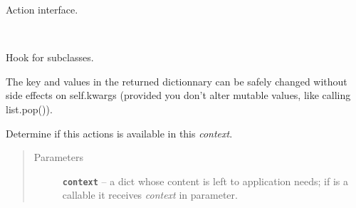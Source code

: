 \documentclass[a4paper,12pt,english]{sphinxmanual}
\begin{document}
\begin{fulllineitems}
\label{api:abilian.web.action.Action}
Action interface.

\begin{fulllineitems}
\label{api:abilian.web.action.Action.Endpoint}~

\begin{fulllineitems}
\label{api:abilian.web.action.Action.Endpoint.get_kwargs}
Hook for subclasses.

The key and values in the returned dictionnary can be safely changed
without side effects on self.kwargs (provided you don't alter
mutable values, like calling list.pop()).

\end{fulllineitems}


\end{fulllineitems}


\begin{fulllineitems}
\label{api:abilian.web.action.Action.available}
Determine if this actions is available in this \emph{context}.
\begin{quote}\begin{description}
\item[{Parameters}] \leavevmode
\textbf{\texttt{context}} -- a dict whose content is left to application needs; if
{\hyperref[api:abilian.web.action.Action.condition]{\emph{}}} is a callable it receives \emph{context}
in parameter.

\end{description}\end{quote}

\end{fulllineitems}


\begin{fulllineitems}
\label{api:abilian.web.action.Action.get_render_args}
\end{fulllineitems}


\end{fulllineitems}
\end{document}
